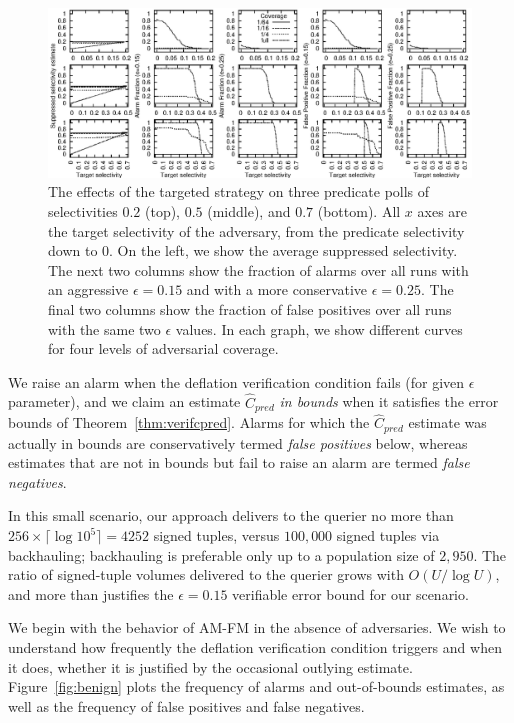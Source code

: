 \documentclass[10pt,twocolumn]{article}
\newcommand{\amfm}{AM-FM\xspace}
\newcommand{\estcpred}{\ensuremath{\hat{C}_\mathit{pred}}\xspace}
\newcommand\vpar{{\vspace*{0.3em}}}
\newcommand{\stitle}[1]{\vpar\noindent{\bf #1\/}}
\begin{document}
\begin{figure}
\centerline{\includegraphics{results/targeted}}
\caption{The effects of the targeted strategy on three predicate polls
  of selectivities $0.2$ (top), $0.5$ (middle), and $0.7$ (bottom).  All
  $x$ axes are the target selectivity of the adversary, from the
  predicate selectivity down to $0$.  On
  the left, we show the average suppressed selectivity.  The next two
  columns show the fraction of alarms over all runs  with an aggressive $\epsilon=0.15$
  and with a more conservative $\epsilon=0.25$.  The final two columns
  show the fraction of false positives over all runs with the same two $\epsilon$ values.
  In each graph, we show different curves for four levels of adversarial
  coverage.}
\label{fig:targeted}
\vspace*{-2em}
\end{figure}

We raise an alarm when the deflation verification condition fails (for given
$\epsilon$ parameter), and we claim an estimate $\estcpred$
\emph{in bounds} when it satisfies the error bounds of Theorem~\ref{thm:verifcpred}.
Alarms for which the $\estcpred$ estimate was actually in bounds
are conservatively termed \emph{false positives} below, whereas estimates
 that are not in bounds but fail to raise an alarm are termed 
\emph{false negatives}.

In this small scenario,
our approach delivers to the querier no more than $256 \times \lceil \log
10^5 \rceil =
4252$ signed tuples, versus $100,000$ signed tuples via backhauling;
backhauling is preferable only up to a population size of $2,950$. The
ratio of signed-tuple volumes delivered to the querier grows with
$O(U/\log U)$, and more than justifies the $\epsilon=0.15$ verifiable
error bound for our scenario.

\stitle{Benign Behavior.}
We begin with the behavior of \amfm in the absence of adversaries.  We
wish to understand how frequently the deflation verification condition triggers
and when it does, whether it is justified by the occasional outlying
estimate. Figure~\ref{fig:benign} plots the frequency of alarms
and out-of-bounds estimates, as well as the frequency of false positives
and false negatives.
\end{document}
